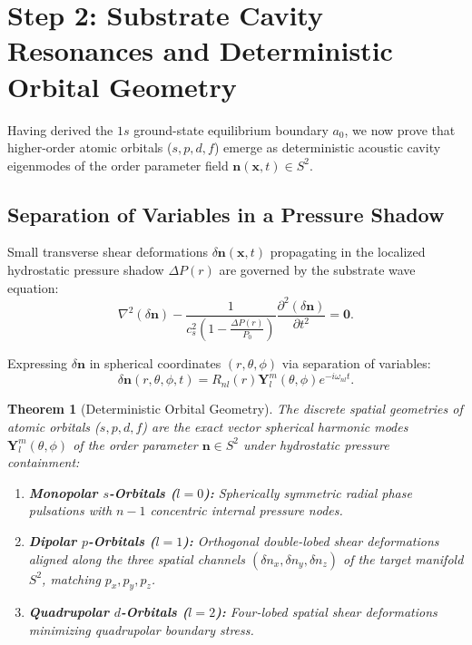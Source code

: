 \documentclass[11pt,a4paper]{article}
\newtheorem{thm}{Theorem}
\begin{document}
	\section{Step 2: Substrate Cavity Resonances and Deterministic Orbital Geometry}
	\label{sec:step2_cavity_resonances}
	
	Having derived the $1s$ ground-state equilibrium boundary $a_0$, we now prove that higher-order atomic orbitals ($s, p, d, f$) emerge as deterministic acoustic cavity eigenmodes of the order parameter field $\mathbf{n}(\mathbf{x}, t) \in S^2$.
	
	\subsection{Separation of Variables in a Pressure Shadow}
	Small transverse shear deformations $\delta \mathbf{n}(\mathbf{x}, t)$ propagating in the localized hydrostatic pressure shadow $\Delta P(r)$ are governed by the substrate wave equation:
	\begin{equation}
		\nabla^2 (\delta \mathbf{n}) - \frac{1}{c_s^2 \left(1 - \frac{\Delta P(r)}{P_0}\right)} \frac{\partial^2 (\delta \mathbf{n})}{\partial t^2} = \mathbf{0}.
		\label{eq:substrate_shear_wave_cavity}
	\end{equation}
	
	Expressing $\delta \mathbf{n}$ in spherical coordinates $(r, \theta, \phi)$ via separation of variables:
	\begin{equation}
		\delta \mathbf{n}(r, \theta, \phi, t) = R_{nl}(r) \mathbf{Y}_l^m(\theta, \phi) e^{-i \omega_{nl} t}.
		\label{eq:separation_of_variables_ansatz}
	\end{equation}
	
	\begin{thm}[Deterministic Orbital Geometry]
		\label{thm:orbital_geometry}
		The discrete spatial geometries of atomic orbitals ($s, p, d, f$) are the exact vector spherical harmonic modes $\mathbf{Y}_l^m(\theta, \phi)$ of the order parameter $\mathbf{n} \in S^2$ under hydrostatic pressure containment:
		\begin{enumerate}
			\item \textbf{Monopolar $s$-Orbitals ($l=0$):} Spherically symmetric radial phase pulsations with $n-1$ concentric internal pressure nodes.
			\item \textbf{Dipolar $p$-Orbitals ($l=1$):} Orthogonal double-lobed shear deformations aligned along the three spatial channels $(\delta n_x, \delta n_y, \delta n_z)$ of the target manifold $S^2$, matching $p_x, p_y, p_z$.
			\item \textbf{Quadrupolar $d$-Orbitals ($l=2$):} Four-lobed spatial shear deformations minimizing quadrupolar boundary stress.
		\end{enumerate}
	\end{thm}
	
\end{document}
